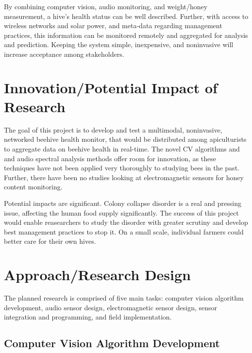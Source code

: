 By combining computer vision, audio monitoring, and weight/honey measurement,  a hive's health status can be well described. Further, with access to wireless networks and solar power, and meta-data regarding management practices, this information can be monitored remotely and aggregated for analysis and prediction. Keeping the system simple, inexpensive, and noninvasive will increase acceptance among stakeholders.

\section{Innovation/Potential Impact of Research}

The goal of this project is to develop and test a multimodal, noninvasive, networked beehive health monitor, that would be distributed among apiculturists to aggregate data on beehive health in real-time. The novel CV algorithms and and audio spectral analysis methods offer room for innovation, as these techniques have not been applied very thoroughly to studying bees in the past. Further, there have been no studies looking at electromagnetic sensors for honey content monitoring.

Potential impacts are significant. Colony collapse disorder is a real and pressing issue, affecting the human food supply significantly. The success of this project would enable reasearchers to study the disorder with greater scrutiny and develop best management practices to stop it. On a small scale, individual farmers could better care for their own hives.

\section{Approach/Research Design}

The planned research is comprised of five main tasks: computer vision algorithm development, audio sensor design, electromagnetic sensor design, sensor integration and programming, and field implementation.

\subsection{Computer Vision Algorithm Development}


